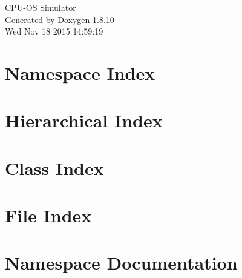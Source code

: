 \documentclass[twoside]{book}
\newcommand{\+}{\discretionary{\mbox{\scriptsize$\hookleftarrow$}}{}{}}
\newcommand{\clearemptydoublepage}{%
  \newpage{\pagestyle{empty}\cleardoublepage}%
}
\begin{document}
\hypersetup{pageanchor=false,
             bookmarks=true,
             bookmarksnumbered=true,
             pdfencoding=unicode
            }
\begin{titlepage}
\vspace*{7cm}
\begin{center}%
{\Large C\+P\+U-\/\+O\+S Simulator }\\
\vspace*{1cm}
{\large Generated by Doxygen 1.8.10}\\
\vspace*{0.5cm}
{\small Wed Nov 18 2015 14:59:19}\\
\end{center}
\end{titlepage}
\clearemptydoublepage
\tableofcontents
\clearemptydoublepage
{}
\hypersetup{pageanchor=true}

\chapter{Namespace Index}

\chapter{Hierarchical Index}

\chapter{Class Index}

\chapter{File Index}

\chapter{Namespace Documentation}






\end{document}
